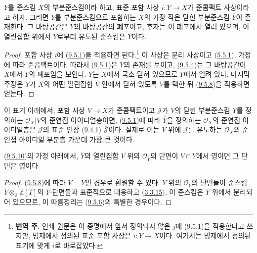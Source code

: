 \begin{proposition}[9.5.10]
\label{I.9.5.10-ko}
$Y$를 준스킴 $X$의 부분준스킴이라 하고, 표준 포함 사상
$i:Y\to X$가 준콤팩트 사상이라고 하자. 그러면 $Y$를 부분준스킴으로
포함하는 $X$의 가장 작은 닫힌 부분준스킴 $\overline{Y}$이 존재한다.
그 바탕공간은 $Y$의 바탕공간의 폐포이고, 후자는 이
폐포에서 열려 있으며, 이 열린집합 위에서 $\overline{Y}$로부터
유도된 준스킴은 $Y$이다.
\end{proposition}

\begin{proof}
포함 사상 $i$에 (\hyperref[I.9.5.1-ko]{9.5.1})을 적용하면
된다.\footnote{\textbf{번역 주.} 인쇄 원문은 이 증명에서 앞서 정의되지
않은 $j$에 (9.5.1)을 적용한다고 쓰지만, 명제에서 정의된 표준 포함
사상은 $i:Y\to X$이다. 여기서는 명제에서 정의된 표기에 맞게 $i$로
바로잡았다.} 이 사상은
분리 사상이고 (\hyperref[I.5.5.1-ko]{5.5.1}), 가정에 따라
준콤팩트이다. 따라서 (\hyperref[I.9.5.1-ko]{9.5.1})은
$\overline{Y}$의 존재를 보이고, (\hyperref[I.9.5.4-ko]{9.5.4})는
그 바탕공간이 $X$에서 $Y$의 폐포임을 보인다. $Y$는 $X$에서 국소
닫혀 있으므로 $\overline{Y}$에서 열려 있다. 마지막 주장은 $Y$가
$X$의 어떤 열린집합 $V$ 안에서 닫혀 있도록 $V$를 택한 뒤
(\hyperref[I.9.5.8-ko]{9.5.8})을 적용하면 얻는다.
\end{proof}

이 표기 아래에서, 포함 사상 $V\to X$가 준콤팩트이고
$\mathscr{J}$가 $V$의 닫힌 부분준스킴 $Y$를 정의하는
$\mathscr{O}_X|V$의 준연접 아이디얼층이면,
(\hyperref[I.9.5.1-ko]{9.5.1})에 따라 $\overline{Y}$을 정의하는
$\mathscr{O}_X$의 준연접 아이디얼층은 $\mathscr{J}$의 표준 연장
(\hyperref[I.9.4.1-ko]{9.4.1}) $\overline{\mathscr{J}}$이다. 실제로
이는 $V$ 위에 $\mathscr{J}$를 유도하는 $\mathscr{O}_X$의 준연접
아이디얼 부분층 가운데 가장 큰 것이다.
\begin{corollary}[9.5.11]
\label{I.9.5.11-ko}
(\hyperref[I.9.5.10-ko]{9.5.10})의 가정 아래에서,
$\overline{Y}$의 열린집합 $V$ 위의 $\mathscr{O}_{\overline{Y}}$의
단면이 $V\cap Y$에서 영이면 그 단면은 영이다.
\end{corollary}

\begin{proof}
(\hyperref[I.9.5.8-ko]{9.5.8})에 따라 $V=\overline{Y}$인 경우로
환원할 수 있다. $\overline{Y}$ 위의 $\mathscr{O}_{\overline{Y}}$의
단면들이 준스킴
$\overline{Y}\otimes_{\mathbb{Z}}\mathbb{Z}[T]$의
$\overline{Y}$-단면들과 표준적으로 대응하고
(\hyperref[I.3.3.15-ko]{3.3.15}), 이 준스킴은 $\overline{Y}$ 위에서
분리되어 있으므로, 이 따름정리는
(\hyperref[I.9.5.6-ko]{9.5.6})의 특별한 경우이다.
\end{proof}

